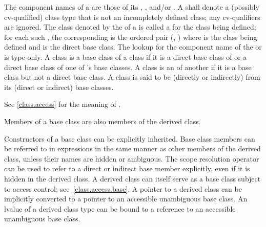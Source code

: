 \pnum
{}%
The component names of a  are those of its
,
, and/or
.
%
A  shall denote
a (possibly cv-qualified) class type that is not
an incompletely defined class;
any cv-qualifiers are ignored.
The class denoted by the  of
a  is called a
for the class being defined;
for each such ,
the corresponding 
is the ordered pair (, )
where  is the class being defined and
 is the direct base class.
%
%
The lookup for the component name of
the  or 
is type-only.
A class  is a
base class of a class  if it is a direct base class of
 or a direct base class of one of 's base classes.
A class is an  of another if it is a base
class but not a direct base class. A class is said to be (directly or
indirectly)  from its (direct or indirect) base
classes.
\begin{note}
See \ref{class.access} for the meaning of
.
\end{note}
%
Members of a base class are also members of the derived class.
\begin{note}
Constructors of a base class can be explicitly inherited.
Base class members can be referred to in
expressions in the same manner as other members of the derived class,
unless their names are hidden or ambiguous.
%
The scope resolution operator \tcode{::} can be used
to refer to a direct or indirect base member explicitly,
even if it is hidden in the derived class.
A derived class can itself serve as a base class subject to access
control; see~\ref{class.access.base}. A pointer to a derived class can be
implicitly converted to a pointer to an accessible unambiguous base
class. An lvalue of a derived class type can be bound
to a reference to an accessible unambiguous base
class.
\end{note}

